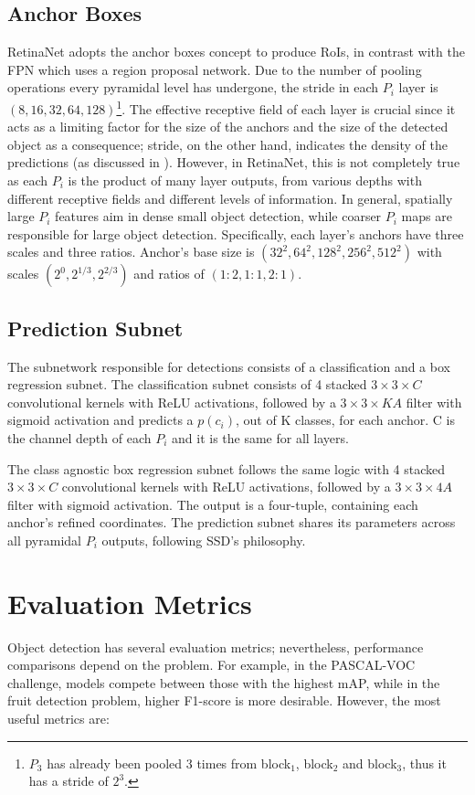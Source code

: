 \subsection{Anchor Boxes}
RetinaNet adopts the anchor boxes concept to produce RoIs, in contrast with the FPN which uses a region proposal network. Due to the number of pooling operations every pyramidal level has undergone, the stride in each $P_i$ layer is $(8, 16, 32, 64, 128)$\footnote{$P_3$ has already been pooled 3 times from block$_1$, block$_2$ and block$_3$, thus it has a stride of $2^3$.}. The effective receptive field of each layer is crucial since it acts as a limiting factor for the size of the anchors and the size of the detected object as a consequence; stride, on the other hand, indicates the density of the predictions (as discussed in ). However, in RetinaNet, this is not completely true as each $P_i$ is the product of many layer outputs, from various depths with different receptive fields and different levels of information. In general, spatially large $P_i$ features aim in dense small object detection, while coarser $P_i$ maps are responsible for large object detection. Specifically, each layer's anchors have three scales and three ratios. Anchor's base size is $(32^2, 64^2, 128^2, 256^2, 512^2)$ with scales $(2^0, 2^{1/3}, 2^{2/3})$ and ratios of $(1\!:\!2,1\!:\!1,2\!:\!1)$.

\subsection{Prediction Subnet}
The subnetwork responsible for detections consists of a classification and a box regression subnet. The classification subnet consists of 4 stacked $3\times3\times C$ convolutional kernels with ReLU activations, followed by a $3\times3\times KA$ filter with sigmoid activation and predicts a $p(c_i)$, out of K classes, for each anchor. C is the channel depth of each $P_i$ and it is the same for all layers.

The class agnostic box regression subnet follows the same logic with 4 stacked $3\times3\times C$ convolutional kernels with ReLU activations, followed by a $3\times3\times 4A$ filter with sigmoid activation. The output is a four-tuple, containing each anchor's refined coordinates. The prediction subnet shares its parameters across all pyramidal $P_i$ outputs, following SSD's philosophy.

\section{Evaluation Metrics}
Object detection has several evaluation metrics; nevertheless, performance comparisons depend on the problem. For example, in the PASCAL-VOC challenge, models compete between those with the highest mAP, while in the fruit detection problem, higher F1-score is more desirable. However, the most useful metrics are:

